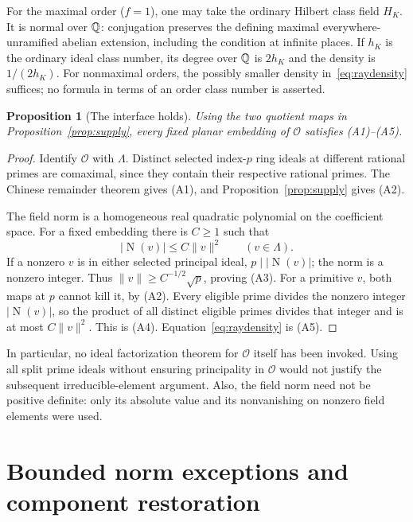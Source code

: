 \documentclass[11pt]{article}
\numberwithin{equation}{section}
\newtheorem{proposition}[theorem]{Proposition}
\theoremstyle{definition}\newtheorem{definition}[theorem]{Definition}
\theoremstyle{remark}\newtheorem{remark}[theorem]{Remark}
\newcommand{\OO}{\mathcal O}\newcommand{\PP}{\mathcal P}
\newcommand{\norm}[1]{\lVert #1\rVert}
\newcommand{\abs}[1]{\lvert #1\rvert}
\newcommand{\N}{\operatorname{N}}
\begin{document}
For the maximal order ($f=1$), one may take the ordinary Hilbert class field $H_K$. It is normal over $\mathbb Q$: conjugation preserves the defining maximal everywhere-unramified abelian extension, including the condition at infinite places. If $h_K$ is the ordinary ideal class number, its degree over $\mathbb Q$ is $2h_K$ and the density is $1/(2h_K)$. For nonmaximal orders, the possibly smaller density in~\eqref{eq:raydensity} suffices; no formula in terms of an order class number is asserted.

\begin{proposition}[The interface holds]\label{prop:interface}
Using the two quotient maps in Proposition~\ref{prop:supply}, every fixed planar embedding of $\OO$ satisfies \textup{(A1)--(A5)}.
\end{proposition}
\begin{proof}
Identify $\OO$ with $\Lambda$. Distinct selected index-$p$ ring ideals at different rational primes are comaximal, since they contain their respective rational primes. The Chinese remainder theorem gives (A1), and Proposition~\ref{prop:supply} gives (A2).

The field norm is a homogeneous real quadratic polynomial on the coefficient space. For a fixed embedding there is $C\ge1$ such that
\begin{equation}\label{eq:normbound}
 \abs{\N(v)}\le C\norm v^2\qquad(v\in\Lambda).
\end{equation}
If a nonzero $v$ is in either selected principal ideal, $p\mid\abs{\N(v)}$; the norm is a nonzero integer. Thus $\norm v\ge C^{-1/2}\sqrt p$, proving (A3). For a primitive $v$, both maps at $p$ cannot kill it, by (A2). Every eligible prime divides the nonzero integer $\abs{\N(v)}$, so the product of all distinct eligible primes divides that integer and is at most $C\norm v^2$. This is (A4). Equation~\eqref{eq:raydensity} is (A5).
\end{proof}

In particular, no ideal factorization theorem for $\OO$ itself has been invoked. Using all split prime ideals without ensuring principality in $\OO$ would not justify the subsequent irreducible-element argument. Also, the field norm need not be positive definite: only its absolute value and its nonvanishing on nonzero field elements were used.

\section{Bounded norm exceptions and component restoration}\label{sec:restoration}
\end{document}
